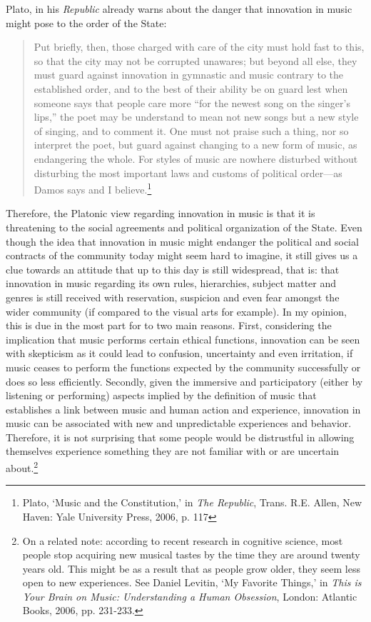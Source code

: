 Plato, in his \emph{Republic} already warns about the danger that innovation in music might pose to the order of the State:
\begin{quote}
Put briefly, then, those charged with care of the city must hold fast to this, so that the city may not be corrupted unawares; but beyond all else, they must guard against innovation in gymnastic and music contrary to the established order, and to the best of their ability be on guard lest when someone says that people care more ``for the newest song on the singer's lips,'' the poet may be understand to mean not new songs but a new style of singing, and to comment it. One must not praise such a thing, nor so interpret the poet, but guard against changing to a new form of music, as endangering the whole. For styles of music are nowhere disturbed without disturbing the most important laws and customs of political order---as Damos says and I believe.\footnote{Plato, `Music and the Constitution,' in \emph{The Republic}, Trans. R.E. Allen, New Haven: Yale University Press, 2006, p. 117}
\end{quote}
Therefore, the Platonic view regarding innovation in music is that it is threatening to the social agreements and political organization of the State. Even though the idea that innovation in music might endanger the political and social contracts of the community today might seem hard to imagine, it still gives us a clue towards an attitude that up to this day is still widespread, that is: that innovation in music regarding its own rules, hierarchies, subject matter and genres is still received with reservation, suspicion and even fear amongst the wider community (if compared to the visual arts for example). In my opinion, this is due in the most part for to two main reasons. First, considering the implication that music performs certain ethical functions, innovation can be seen with skepticism as it could lead to confusion, uncertainty and even irritation, if music ceases to perform the functions expected by the community successfully or does so less efficiently. Secondly, given the immersive and participatory (either by listening or performing) aspects implied by the definition of music that establishes a link between music and human action and experience, innovation in music can be associated with new and unpredictable experiences and behavior. Therefore, it is not surprising that some people would be distrustful in allowing themselves experience something they are not familiar with or are uncertain about.\footnote{On a related note: according to recent research in cognitive science, most people stop acquiring new musical tastes by the time they are around twenty years old. This might be as a result that as people grow older, they seem less open to new experiences. See Daniel Levitin, `My Favorite Things,' in \emph{This is Your Brain on Music: Understanding a Human Obsession}, London: Atlantic Books, 2006, pp. 231-233.}

